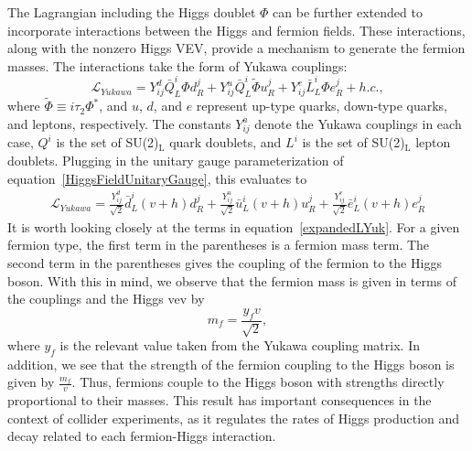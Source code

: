 The Lagrangian including the Higgs doublet $\Phi$ can be further extended to incorporate interactions between the Higgs and fermion fields. These interactions, along with the nonzero Higgs VEV, provide a mechanism to generate the fermion masses. The interactions take the 
form of Yukawa couplings:
\begin{equation}
    \mathcal{L}_{Yukawa} = Y_{ij}^{d}\bar{Q}^{i}_{L}\Phi d_{R}^{j} + Y_{ij}^{u}\bar{Q}^{i}_{L}\tilde{\Phi} u_{R}^{j} 
    + Y_{ij}^{e}\bar{L}^{i}_{L}\Phi e_{R}^{j} + h.c.,
    \label{LYukawa}
\end{equation}
where $\tilde{\Phi} \equiv i\tau_{2}\Phi^{*}$, and $u$, $d$, and $e$ represent up-type quarks, down-type quarks, and leptons, respectively. The constants $Y_{ij}^a$ denote the Yukawa couplings in each case, $Q^i$ is the set of SU(2)$_{\mathrm{L}}$ quark doublets, and $L^i$ is the set of SU(2)$_{\mathrm{L}}$ lepton doublets.
Plugging in the unitary gauge parameterization of equation~\ref{HiggsFieldUnitaryGauge}, this evaluates to 
\begin{align}
    \mathcal{L}_{Yukawa} = \frac{Y_{ij}^{d}}{\sqrt{2}}\bar{d}_{L}^{i}(v + h)d_{R}^{j} 
    + \frac{Y_{ij}^{u}}{\sqrt{2}}\bar{u}_{L}^{i}(v+h)u_{R}^{j} + \frac{Y_{ij}^{e}}{\sqrt{2}}\bar{e}_{L}^{i}(v+h)e_{R}^{j}
    \label{expandedLYuk}
\end{align}
It is worth looking closely at the terms in equation~\ref{expandedLYuk}. For a given fermion type, the first term in the parentheses
is a fermion mass term. The second term in the parentheses gives the coupling of the fermion to the Higgs boson. With this in mind, 
we observe that the fermion mass is given in terms of the couplings and the Higgs vev by 
\begin{equation}
    m_{f} = \frac{y_{f}v}{\sqrt{2}},
    \label{fermionMass}
\end{equation}
where $y_{f}$ is the relevant value taken from the Yukawa coupling matrix. In addition, we see that the strength of the fermion coupling
to the Higgs boson is given by $\frac{m_{f}}{v}$. Thus, fermions couple to the Higgs boson with strengths directly proportional 
to their masses. This result has important consequences in the context of collider experiments, as it regulates the rates of
Higgs production and decay related to each fermion-Higgs interaction. 

